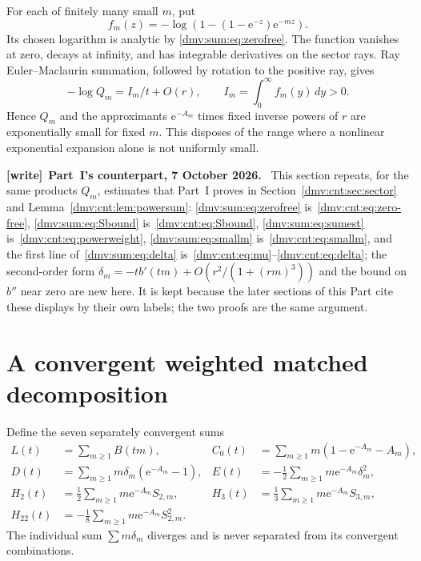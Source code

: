 \documentclass[11pt,letterpaper]{article}
\numberwithin{equation}{section}
\theoremstyle{definition}\newtheorem{definition}[theorem]{Definition}
\theoremstyle{remark}\newtheorem{remark}[theorem]{Remark}
\newcommand{\ee}{\mathrm e}
\newenvironment{writenote}[1][]{\par\smallskip\begingroup\small
 \noindent\textbf{[write]}\if\relax\detokenize{#1}\relax\else~\textbf{#1.}\fi\ }%
 {\par\endgroup\smallskip}
\begin{document}
For each of finitely many small $m$, put
\[
 f_m(z)=-\log(1-(1-\ee^{-z})\ee^{-mz}).
\]
Its chosen logarithm is analytic by \eqref{dmv:sum:eq:zerofree}. The function vanishes at zero, decays at infinity, and has integrable derivatives on the sector rays. Ray Euler--Maclaurin summation, followed by rotation to the positive ray, gives
\begin{equation}\label{dmv:sum:eq:smallm}
 -\log Q_m=I_m/t+O(r),\qquad I_m=\int_0^\infty f_m(y)\,dy>0.
\end{equation}
Hence $Q_m$ and the approximants $\ee^{-A_m}$ times fixed inverse powers of $r$ are exponentially small for fixed $m$. This disposes of the range where a nonlinear exponential expansion alone is not uniformly small.

\begin{writenote}[Part~I's counterpart, 7 October 2026]
This section repeats, for the same products $Q_m$, estimates that Part~I
proves in Section~\ref{dmv:cnt:sec:sector} and Lemma~\ref{dmv:cnt:lem:powersum}:
\eqref{dmv:sum:eq:zerofree} is~\eqref{dmv:cnt:eq:zero-free},
\eqref{dmv:sum:eq:Sbound} is~\eqref{dmv:cnt:eq:Sbound},
\eqref{dmv:sum:eq:sumest} is~\eqref{dmv:cnt:eq:powerweight},
\eqref{dmv:sum:eq:smallm} is~\eqref{dmv:cnt:eq:smallm}, and the first line
of~\eqref{dmv:sum:eq:delta} is~\eqref{dmv:cnt:eq:mu}--\eqref{dmv:cnt:eq:delta};
the second-order form $\delta_m=-tb'(tm)+O(r^2/(1+(rm)^3))$ and the bound on
$b''$ near zero are new here. It is kept because the later sections of this
Part cite these displays by their own labels; the two proofs are the same
argument.
\end{writenote}

\section{A convergent weighted matched decomposition}\label{dmv:sum:sec:match}
Define the seven separately convergent sums
\begin{align}\label{dmv:sum:eq:pieces}
 L(t)&=\sum_{m\ge1}B(tm),&
 C_0(t)&=\sum_{m\ge1}m(1-\ee^{-A_m}-A_m),\nonumber\\
 D(t)&=\sum_{m\ge1}m\delta_m(\ee^{-A_m}-1),&
 E(t)&=-\frac12\sum_{m\ge1}m\ee^{-A_m}\delta_m^2,\\
 H_2(t)&=\frac12\sum_{m\ge1}m\ee^{-A_m}S_{2,m},&
 H_3(t)&=\frac13\sum_{m\ge1}m\ee^{-A_m}S_{3,m},\nonumber\\
 H_{22}(t)&=-\frac18\sum_{m\ge1}m\ee^{-A_m}S_{2,m}^2.&&\nonumber
\end{align}
The individual sum $\sum m\delta_m$ diverges and is never separated from its convergent combinations.
\end{document}
